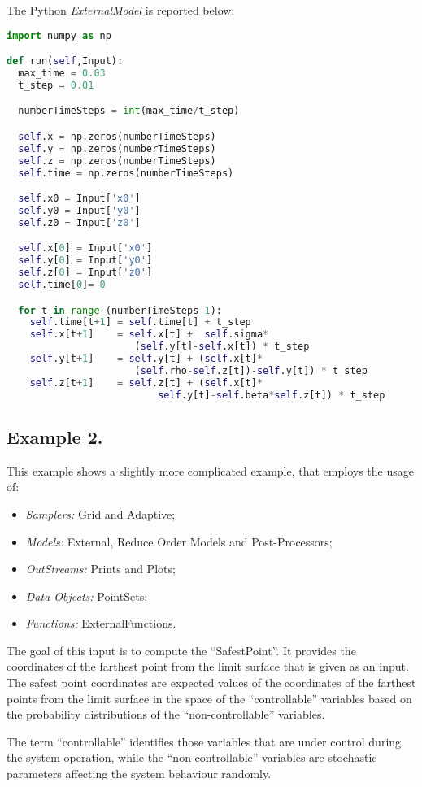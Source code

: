 The Python \textit{ExternalModel} is reported below:
\begin{lstlisting}[language=python]
import numpy as np

def run(self,Input):
  max_time = 0.03
  t_step = 0.01

  numberTimeSteps = int(max_time/t_step)

  self.x = np.zeros(numberTimeSteps)
  self.y = np.zeros(numberTimeSteps)
  self.z = np.zeros(numberTimeSteps)
  self.time = np.zeros(numberTimeSteps)

  self.x0 = Input['x0']
  self.y0 = Input['y0']
  self.z0 = Input['z0']

  self.x[0] = Input['x0']
  self.y[0] = Input['y0']
  self.z[0] = Input['z0']
  self.time[0]= 0

  for t in range (numberTimeSteps-1):
    self.time[t+1] = self.time[t] + t_step
    self.x[t+1]    = self.x[t] +  self.sigma*
                      (self.y[t]-self.x[t]) * t_step
    self.y[t+1]    = self.y[t] + (self.x[t]*
                      (self.rho-self.z[t])-self.y[t]) * t_step
    self.z[t+1]    = self.z[t] + (self.x[t]*
                          self.y[t]-self.beta*self.z[t]) * t_step
\end{lstlisting}
\subsection{Example 2.}
\label{subsec:ex1}
This example shows a slightly more complicated example, that employs the usage of:
\begin{itemize}
    \item \textit{Samplers:} Grid and Adaptive;
    \item \textit{Models:} External, Reduce Order Models and Post-Processors;
    \item \textit{OutStreams:} Prints and Plots;
    \item \textit{Data Objects:} PointSets;
    \item \textit{Functions:} ExternalFunctions.
\end{itemize}
The goal of this input is to compute the ``SafestPoint''.
It provides the coordinates of the farthest
point from the limit surface that is given as an input.
%
The safest point coordinates are expected values of the coordinates of the
farthest points from the limit surface in the space of the ``controllable''
variables based on the probability distributions of the ``non-controllable''
variables.

The term ``controllable'' identifies those variables that are under control
during the system operation, while the ``non-controllable'' variables are
stochastic parameters affecting the system behaviour randomly.

